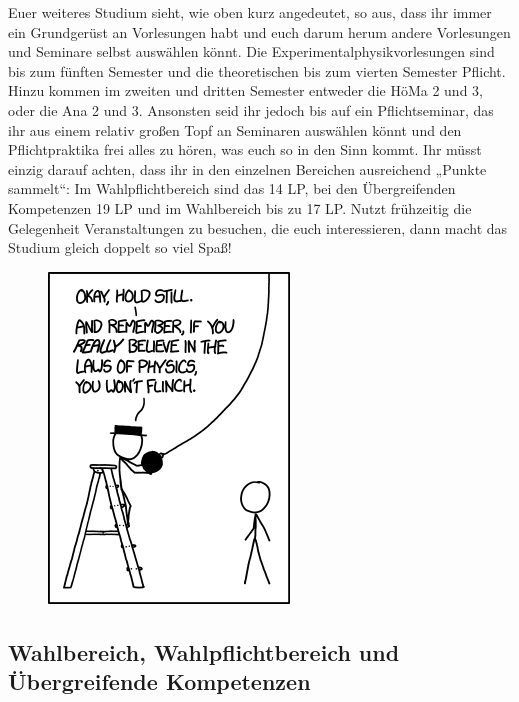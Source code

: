 Euer weiteres Studium sieht, wie oben kurz angedeutet, so aus, dass ihr immer ein Grundgerüst an Vorlesungen habt und euch darum herum andere Vorlesungen und Seminare selbst auswählen könnt. Die Experimentalphysikvorlesungen sind bis zum fünften Semester und die theoretischen bis zum vierten Semester Pflicht. Hinzu kommen im zweiten und dritten Semester entweder die HöMa 2 und 3, oder die Ana 2 und 3. Ansonsten seid ihr jedoch bis auf ein Pflichtseminar, das ihr aus einem relativ großen Topf an Seminaren auswählen könnt und den Pflichtpraktika frei alles zu hören, was euch so in den Sinn kommt. Ihr müsst einzig darauf achten, dass ihr in den einzelnen Bereichen ausreichend „Punkte sammelt“: Im Wahlpflichtbereich sind das 14 \gls{LP}, bei den Übergreifenden Kompetenzen 19 \gls{LP} und im Wahlbereich bis zu 17 \gls{LP}. Nutzt frühzeitig die Gelegenheit Veranstaltungen zu besuchen, die euch interessieren, dann macht das Studium gleich doppelt so viel Spaß!

\begin{figure}[b]
	\centering
	\includegraphics[width=.75\linewidth]{bilder/laws_of_physics.png}
\end{figure}

\subsection{Wahlbereich, Wahlpflichtbereich und \\Übergreifende Kompetenzen}

